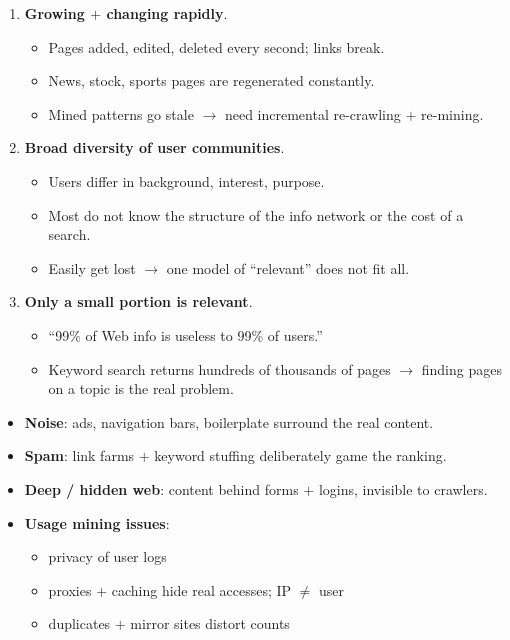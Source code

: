 {\begin{enumerate}
  \item \textbf{Growing $+$ changing rapidly}.
  \begin{itemize}
    \item Pages added, edited, deleted every second; links break.
    \item News, stock, sports pages are regenerated constantly.
    \item Mined patterns go stale $\rightarrow$ need incremental re-crawling $+$ re-mining.
  \end{itemize}
  \item \textbf{Broad diversity of user communities}.
  \begin{itemize}
    \item Users differ in background, interest, purpose.
    \item Most do not know the structure of the info network or the cost of a search.
    \item Easily get lost $\rightarrow$ one model of ``relevant'' does not fit all.
  \end{itemize}
  \item \textbf{Only a small portion is relevant}.
  \begin{itemize}
    \item ``99\% of Web info is useless to 99\% of users.''
    \item Keyword search returns hundreds of thousands of pages $\rightarrow$ finding
           pages on a topic is the real problem.
  \end{itemize}
\end{enumerate}
\begin{itemize}
  \item \textbf{Noise}: ads, navigation bars, boilerplate surround the real content.
  \item \textbf{Spam}: link farms $+$ keyword stuffing deliberately game the ranking.
  \item \textbf{Deep / hidden web}: content behind forms $+$ logins, invisible to crawlers.
  \item \textbf{Usage mining issues}:
  \begin{itemize}
    \item privacy of user logs
    \item proxies $+$ caching hide real accesses; IP $\neq$ user
    \item duplicates $+$ mirror sites distort counts
  \end{itemize}
\end{itemize}}{%
}
